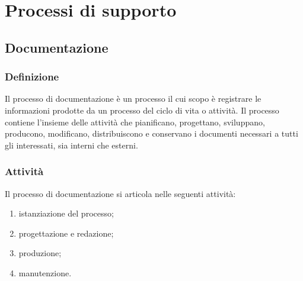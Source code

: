 \chapter{Processi di supporto}
\section{Documentazione} \label{sec:documentazione}
\subsection{Definizione}
Il processo di documentazione è un processo il cui scopo è registrare le informazioni prodotte da un processo del ciclo di vita o attività. Il processo contiene l'insieme delle attività che pianificano, progettano, sviluppano, producono, modificano, distribuiscono e conservano i documenti necessari a tutti gli interessati, sia interni che esterni.
\subsection{Attività}
Il processo di documentazione si articola nelle seguenti attività:
\begin{enumerate}
    \item istanziazione del processo;
    \item progettazione e redazione;
    \item produzione;
    \item manutenzione.
\end{enumerate}
